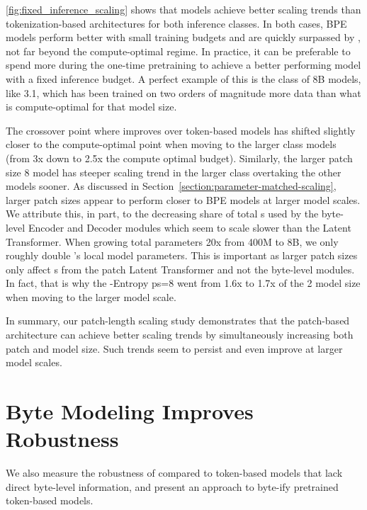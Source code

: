 \documentclass[]{fairmeta}
\begin{document}
\autoref{fig:fixed_inference_scaling} shows that \model{} models achieve better scaling trends than tokenization-based architectures for both inference \flop{} classes. In both cases, BPE models  perform better with small training budgets and are quickly surpassed by \model{}, not far beyond the compute-optimal regime. In practice, it can be preferable to spend more during the one-time pretraining to achieve a better performing model with a fixed inference budget. A perfect example of this is the class of 8B models, like \llama{} 3.1, which has been trained on two orders of magnitude more data than what is compute-optimal for that model size.


The crossover point where \model{} improves over token-based models has shifted slightly closer to the compute-optimal point when moving to the larger \flop{} class models (from 3x down to 2.5x the compute optimal budget). Similarly, the larger patch size 8 model has steeper scaling trend in the larger \flop{} class overtaking the other models sooner.
As discussed in Section~\ref{section:parameter-matched-scaling}, larger patch sizes appear to perform closer to BPE models at larger model scales. We attribute this, in part, to the decreasing share of total \flop{}s used by the byte-level Encoder and Decoder modules which seem to scale slower than the Latent Transformer. When growing total parameters 20x from 400M to 8B, we only roughly double \model{}'s local model parameters. This is important as larger patch sizes only affect \flop{}s from the patch Latent Transformer and not the byte-level modules. In fact, that is why the \model{}-Entropy ps=8 went from 1.6x to 1.7x of the \llama{} 2 model size when moving to the larger model scale.

In summary, our patch-length scaling study demonstrates that the \model{} patch-based architecture can achieve better scaling trends by simultaneously increasing both patch and model size. Such trends seem to persist and even improve at larger model scales.





\section{Byte Modeling Improves Robustness}
We also measure the robustness of \model{} compared to token-based models that lack direct byte-level information, and present an approach to byte-ify pretrained token-based models.
\label{sec:robustness}
\end{document}
